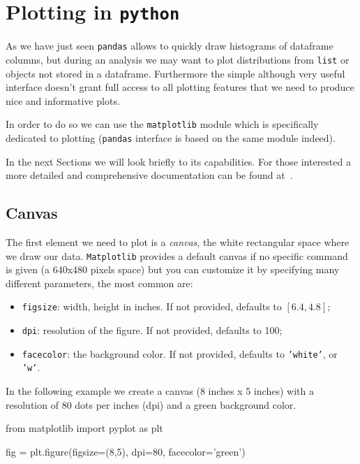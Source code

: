 \section{Plotting in \texttt{python}}\label{plotting-in-python}

As we have just seen \texttt{pandas} allows to quickly draw histograms of dataframe columns, but during an analysis we may want to plot distributions from \texttt{list} or objects not stored in a dataframe. Furthermore the simple although very useful interface doesn't grant full access to all plotting features that we need to produce nice and informative plots.

In order to do so we can use the \texttt{matplotlib} module which is specifically dedicated to plotting (\texttt{pandas} interface is based on the same module indeed). 

In the next Sections we will look briefly to its capabilities. For those interested a more detailed and comprehensive documentation can be found at~\cite{matplotlib}.

\subsection{Canvas}\label{canvas}

The first element we need to plot is a \emph{canvas}, the white rectangular space where we draw our data. \texttt{Matplotlib} provides a default canvas if no specific command is given (a 640x480 pixels space) but you can customize it by specifying many different parameters, the most common are:

\begin{itemize}
	\tightlist
	\item
	\texttt{figsize}: width, height in inches. If not provided, defaults to \([6.4, 4.8]\);
	\item
	\texttt{dpi}: resolution of the figure. If not provided, defaults to 100;
	\item
	\texttt{facecolor}: the background color. If not provided, defaults to \texttt{'white'}, or \texttt{'w'}.
\end{itemize}

In the following example we create a canvas (8 inches x 5 inches) with a resolution of 80 dots per inches (dpi) and a green background color.

\begin{ipython}
from matplotlib import pyplot as plt

fig = plt.figure(figsize=(8,5), dpi=80, facecolor='green')
\end{ipython}


